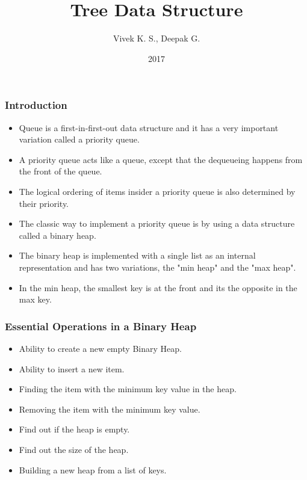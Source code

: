 \documentclass{beamer}
\title{Tree Data Structure}
\author{Vivek K. S., Deepak G.}
\institute{Information Systems Decision Sciences (ISDS)\\
MUMA College of Business\\
University of South Florida \\
Tampa, Florida}
\date{2017}
\begin{document}
 
\frame{\titlepage}
\begin{frame}
\frametitle{Introduction}
\begin{itemize}
\item Queue is a first-in-first-out data structure and it has a very important variation called a priority queue.
\item A priority queue acts like a queue, except that the dequeueing happens from the front of the queue.
\item The logical ordering of items insider a priority queue is also determined by their priority.
\item The classic way to implement a priority queue is by using a data structure called a binary heap.
\item The binary heap is implemented with a single list as an internal representation and has two variations, the "min heap" and the "max heap".
\item In the min heap, the smallest key is at the front and its the opposite in the max key.
\end{itemize}
\end{frame}


\begin{frame}
\frametitle{Essential Operations in a Binary Heap}
\begin{itemize}
\item Ability to create a new empty Binary Heap.
\item Ability to insert a new item.
\item Finding the item with the minimum key value in the heap.
\item Removing the item with the minimum key value.
\item Find out if the heap is empty.
\item Find out the size of the heap.
\item Building a new heap from a list of keys.
\end{itemize}
\end{frame}
\end{document}
